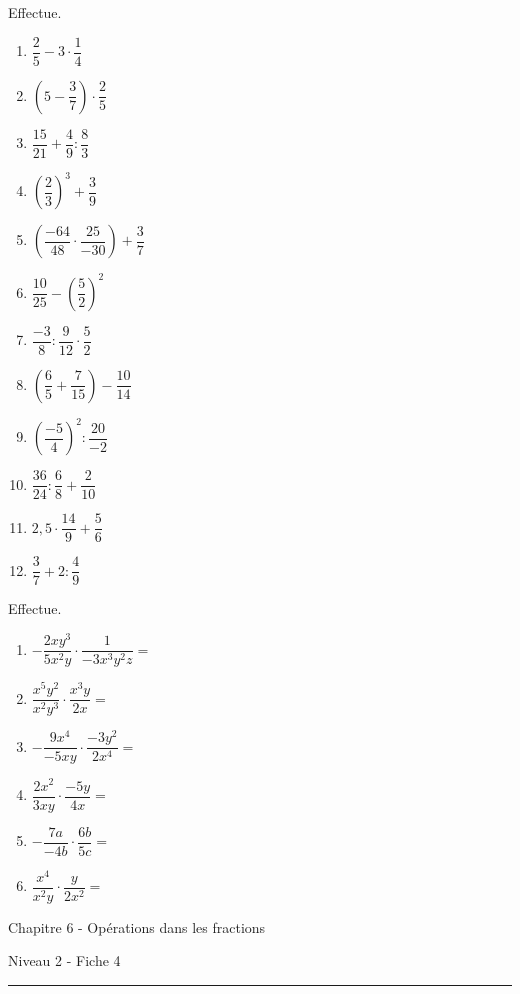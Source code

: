 \documentclass[12pt,parskip=half-, twoside=semi]{scrartcl}
\begin{document}
  \begin{exercise}
    Effectue.
    \begin{enumerate}[cols=3]
      \item $\dfrac{2}{5} - 3 \cdot \dfrac{1}{4}$
      \item $\left(5 - \dfrac{3}{7}\right) \cdot \dfrac{2}{5}$
      \item $\dfrac{15}{21} + \dfrac{4}{9}:\dfrac{8}{3}$
      \item $\left(\dfrac{2}{3}\right)^3 +\dfrac{3}{9}$
      \item $\left(\dfrac{-64}{48} \cdot \dfrac{25}{-30}\right) + \dfrac{3}{7}$
      \item $\dfrac{10}{25} - \left(\dfrac{5}{2}\right)^2$
      \item $\dfrac{-3}{8} : \dfrac{9}{12} \cdot \dfrac{5}{2}$
      \item $\left(\dfrac{6}{5} + \dfrac{7}{15}\right) - \dfrac{10}{14}$
      \item $\left(\dfrac{-5}{4}\right)^2 : \dfrac{20}{-2}$
      \item $\dfrac{36}{24} : \dfrac{6}{8}+\dfrac{2}{10}$
      \item $2,5 \cdot \dfrac{14}{9}+\dfrac{5}{6}$
      \item $\dfrac{3}{7} + 2 :\dfrac{4}{9}$
    \end{enumerate}
  \end{exercise}

  \begin{exercise}
    Effectue.
    \begin{enumerate}[cols=2]
      \item  $-\dfrac{2xy^3}{5x^2y} \cdot \dfrac{1}{-3x^3y^2z}=$
      \item  $\dfrac{x^5y^2}{x^2y^3} \cdot \dfrac{x^3y}{2x}=$
      \item  $-\dfrac{9x^4}{-5xy} \cdot \dfrac{-3y^2}{2x^4}=$
      \item  $\dfrac{2x^2}{3xy} \cdot \dfrac{-5y}{4x}=$
      \item  $-\dfrac{7a}{-4b} \cdot \dfrac{6b}{5c}=$
      \item  $\dfrac{x^4}{x^2y} \cdot \dfrac{y}{2x^2}=$
    \end{enumerate}
  \end{exercise}

\newpage

  \begin{center}
    \bfseries
    \begin{Huge}
      Chapitre 6 - Opérations dans les fractions
    \end{Huge}
    \smallbreak
    \begin{large}
      Niveau 2  - Fiche 4
    \end{large}
    \smallbreak
    \rule[10pt]{.5\linewidth}{1 pt}
  \end{center}
  
\end{document}
